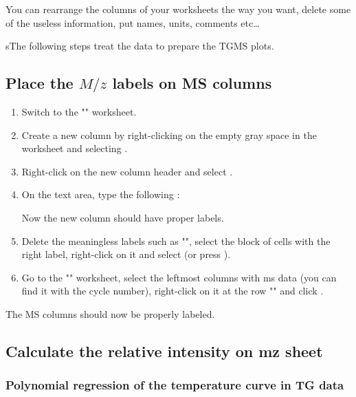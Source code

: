 \documentclass[a4paper, 11pt, raggedright, parskip, sans, colorful]{tufte-style-article}
\begin{document}
You can rearrange the columns of your worksheets the way you want, delete some of the useless information, put names, units, comments etc\dots{}

sThe following steps treat the data to prepare the TGMS plots.


\subsection{Place the $M/z$ labels on MS columns}

\begin{enumerate}
    \item Switch to the "" worksheet.
    \item Create a new column by right-clicking on the empty gray space in the worksheet and selecting .
    \item Right-click on the new column header and select .
    \item On the text area, type the following :
    
    Now the new column should have proper labels.
    \item Delete the meaningless labels such as "", select the block of cells with the right label, right-click on it and select  (or press ).
    \item Go to the "" worksheet, select the leftmost columns with ms data (you can find it with the cycle number), right-click on it at the row "" and click .
\end{enumerate}

The MS columns should now be properly labeled.

\subsection{Calculate the relative intensity on mz sheet}


\subsubsection{Polynomial regression of the temperature curve in TG data}
\end{document}
